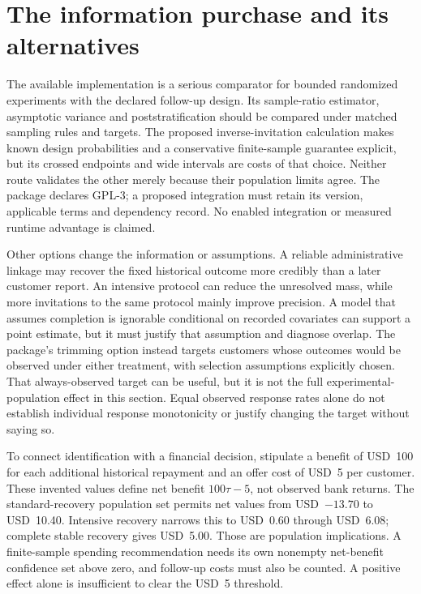 \section{The information purchase and its alternatives}

The available implementation is a serious comparator for bounded randomized
experiments with the declared follow-up design. Its sample-ratio estimator,
asymptotic variance and poststratification should be compared under matched
sampling rules and targets. The proposed inverse-invitation calculation makes
known design probabilities and a conservative finite-sample guarantee explicit,
but its crossed endpoints and wide intervals are costs of that choice. Neither
route validates the other merely because their population limits agree.
The package declares GPL-3; a proposed integration must retain its version,
applicable terms and dependency record. No enabled integration or measured
runtime advantage is claimed. \citep{rel73attrition}

Other options change the information or assumptions. A reliable administrative
linkage may recover the fixed historical outcome more credibly than a later
customer report. An intensive protocol can reduce the unresolved mass, while
more invitations to the same protocol mainly improve precision. A model that
assumes completion is ignorable conditional on recorded covariates can support
a point estimate, but it must justify that assumption and diagnose overlap.
The package's trimming option instead targets customers whose outcomes would
be observed under either treatment, with selection assumptions explicitly
chosen. That always-observed target can be useful, but it is not the full
experimental-population effect in this section. Equal observed response rates
alone do not establish individual response monotonicity or justify changing
the target without saying so. \citep{rel73attrition}

To connect identification with a financial decision, stipulate a benefit of
USD~100 for each additional historical repayment and an offer cost of USD~5
per customer. These invented values define net benefit $100\tau-5$, not
observed bank returns. The standard-recovery population set permits net
values from USD~$-13.70$ to USD~10.40. Intensive recovery narrows this to
USD~0.60 through USD~6.08; complete stable recovery gives USD~5.00. Those
are population implications. A finite-sample spending recommendation needs
its own nonempty net-benefit confidence set above zero, and follow-up costs
must also be counted. A positive effect alone is insufficient to clear the
USD~5 threshold.

